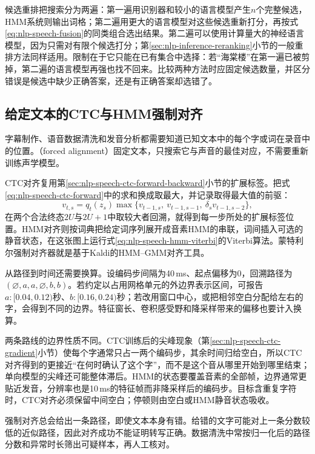 候选重排把搜索分为两遍：第一遍用识别器和较小的语言模型产生$n$个完整候选，HMM系统则输出词格；第二遍用更大的语言模型对这些候选重新打分，再按式\eqref{eq:nlp-speech-fusion}的同类组合选出结果。第二遍可以使用计算量大的神经语言模型，因为只需对有限个候选打分；第\ref{sec:nlp-inference-reranking}小节的一般重排方法同样适用。限制在于它只能在已有集合中选择：若“海棠楼”在第一遍已被剪掉，第二遍的语言模型再强也找不回来。比较两种方法时应固定候选数量，并区分错误是候选中缺少正确答案，还是有正确答案却选错了。

\subsection{给定文本的CTC与HMM强制对齐}
\label{sec:nlp-speech-forced-alignment}

字幕制作、语音数据清洗和发音分析都需要知道已知文本中的每个字或词在录音中的位置。（forced alignment）固定文本，只搜索它与声音的最佳对应，不需要重新训练声学模型。

CTC对齐复用第\ref{sec:nlp-speech-ctc-forward-backward}小节的扩展标签。把式\eqref{eq:nlp-speech-ctc-forward}中的求和换成取最大，并记录取得最大值的前驱：
\begin{equation}
 v_{t,s}=q_t(z_s)\max\{v_{t-1,s},\ v_{t-1,s-1},\ \delta_sv_{t-1,s-2}\},
 \label{eq:nlp-speech-ctc-viterbi}
\end{equation}
在两个合法终态$2U$与$2U+1$中取较大者回溯，就得到每一步所处的扩展标签位置。HMM对齐则按词典把给定词序列展开成音素HMM的串联，词间插入可选的静音状态，在这张图上运行式\eqref{eq:nlp-speech-hmm-viterbi}的Viterbi算法。蒙特利尔强制对齐器就是基于Kaldi的HMM--GMM对齐工具。

从路径到时间还需要换算。设编码步间隔为40\,ms、起点偏移为0，回溯路径为$(\varnothing,a,a,\varnothing,b,b)$。若约定以占用网格单元的外边界表示区间，可报告$a:[0.04,0.12)$秒、$b:[0.16,0.24)$秒；若改用窗口中心，或把相邻空白分配给左右的字，会得到不同的边界。特征窗长、卷积感受野和降采样带来的偏移也要计入换算。

两条路线的边界性质不同。CTC训练后的尖峰现象（第\ref{sec:nlp-speech-ctc-gradient}小节）使每个字通常只占一两个编码步，其余时间归给空白，所以CTC对齐得到的更接近“在何时确认了这个字”，而不是这个音从哪里开始到哪里结束；单向模型的尖峰还可能整体滞后。HMM的状态要覆盖音素的全部帧，边界通常更贴近发音，分辨率也是10\,ms的特征帧而非降采样后的编码步。目标含重复字符时，CTC对齐必须保留中间空白；停顿则由空白或HMM静音状态吸收。

强制对齐总会给出一条路径，即使文本本身有错。给错的文字可能对上一条分数较低的近似路径，因此对齐成功不能证明转写正确。数据清洗中常按归一化后的路径分数和异常时长筛出可疑样本，再人工核对。

